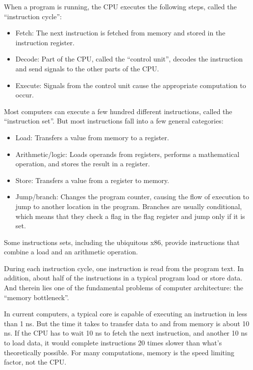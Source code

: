 \documentclass[12pt]{book}
\begin{document}
When a program is running, the CPU executes the following steps,
called the ``instruction cycle'':

\begin{itemize}

\item Fetch: The next instruction is fetched from memory and stored
in the instruction register.

\item Decode: Part of the CPU, called the ``control unit'', decodes
the instruction and send signals to the other parts of
the CPU.

\item Execute: Signals from the control unit cause the appropriate
  computation to occur.

\end{itemize}

Most computers can execute a few hundred different instructions,
called the ``instruction set''.  But most instructions fall
into a few general categories:

\begin{itemize}

\item Load: Transfers a value from memory to a register.

\item Arithmetic/logic: Loads operands from registers, performs
a mathematical operation, and stores the result in a register.

\item Store: Transfers a value from a register to memory.

\item Jump/branch: Changes the program counter, causing the flow
of execution to jump to another location in the program.  Branches
are usually conditional, which means that they check a flag
in the flag register and jump only if it is set.

\end{itemize}

Some instructions sets, including the ubiquitous x86, provide
instructions that combine a load and an arithmetic operation.

During each instruction cycle, one instruction is read from the
program text.  In addition, about half of the instructions in a
typical program load or store data.  And therein
lies one of the fundamental problems of computer architecture: the
``memory bottleneck''.

In current computers, a typical core is capable of executing an instruction in less than 1 ns.  But the time it takes to transfer data to and from memory is about 10 ns.  If the CPU has to wait 10 ns to fetch the next instruction, and another 10 ns to load data, it would complete instructions 20 times slower than what's theoretically possible.  For many computations, memory is the speed limiting factor, not the CPU.
\end{document}
